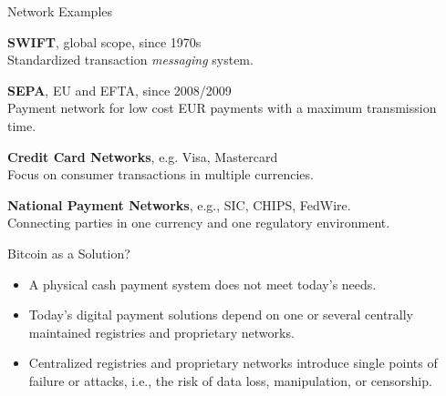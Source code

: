 \documentclass[handout]{beamer}
\begin{document}
\begin{frame}{Network Examples}

\textbf{SWIFT}, global scope, since 1970s\\
Standardized transaction \textit{messaging }system.

\vspace{1em}

\textbf{SEPA}, EU and EFTA, since 2008/2009\\
Payment network for low cost EUR payments with a maximum transmission time.

\vspace{1em}

\textbf{Credit Card Networks}, e.g. Visa, Mastercard\\
Focus on consumer transactions in multiple currencies. 

\vspace{1em}

\textbf{National Payment Networks}, e.g., SIC, CHIPS, FedWire.\\ 
Connecting parties in one currency and one regulatory environment.

\end{frame}

\begin{frame}{Bitcoin as a Solution?}

\begin{itemize}
	\item A physical cash payment system does not meet today's needs.
	\item<2-> Today's digital payment solutions depend on one or several centrally maintained registries and proprietary networks.
	\item<3-> Centralized registries and proprietary networks introduce single points of failure or attacks, i.e., the risk of data loss, manipulation, or censorship.
\end{itemize}
\vspace{1em}

\end{frame}
\end{document}

